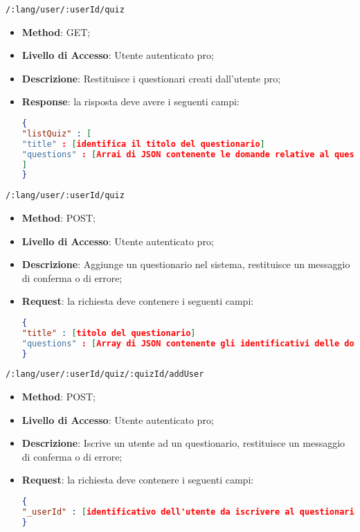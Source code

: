 \item \texttt{/:lang/user/:userId/quiz}
	\begin{itemize}
		\item \textbf{Method}: GET;
		\item \textbf{Livello di Accesso}: Utente autenticato pro;
		\item \textbf{Descrizione}: Restituisce i questionari creati dall'utente pro;
		\item \textbf{Response}: la risposta deve avere i seguenti campi:
\begin{lstlisting}[language=json,firstnumber=1]
{
"listQuiz" : [ 
"title" : [identifica il titolo del questionario]
"questions" : [Arrai di JSON contenente le domande relative al questionario]
]
}
\end{lstlisting}
	\end{itemize}	
	
	
	\item \texttt{/:lang/user/:userId/quiz}
		\begin{itemize}
			\item \textbf{Method}: POST;
			\item \textbf{Livello di Accesso}: Utente autenticato pro;
			\item \textbf{Descrizione}: Aggiunge un questionario nel sistema, restituisce un messaggio di conferma o di errore;
			\item \textbf{Request}: la richiesta deve contenere i seguenti campi:
\begin{lstlisting}[language=json,firstnumber=1]
{
"title" : [titolo del questionario]
"questions" : [Array di JSON contenente gli identificativi delle domande che compongono il questionario]
}
\end{lstlisting}
		\end{itemize}
		
		
	\item \texttt{/:lang/user/:userId/quiz/:quizId/addUser}
	\begin{itemize}
		\item \textbf{Method}: POST;
		\item \textbf{Livello di Accesso}: Utente autenticato pro;
		\item \textbf{Descrizione}: Iscrive un utente ad un questionario, restituisce un messaggio di conferma o di errore;
		\item \textbf{Request}: la richiesta deve contenere i seguenti campi:
\begin{lstlisting}[language=json,firstnumber=1]
{
"_userId" : [identificativo dell'utente da iscrivere al questionario]
}
\end{lstlisting}
	\end{itemize}
	
